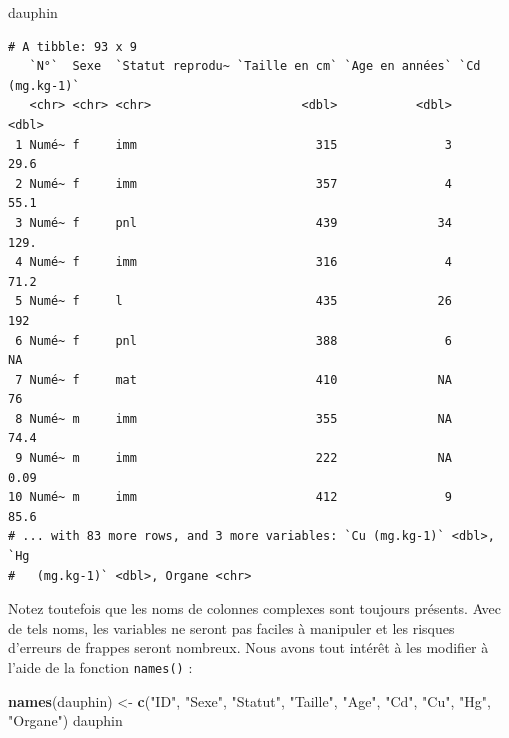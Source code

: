 \documentclass[a4paperpaper,]{article}
\newenvironment{Shaded}{\begin{snugshade}}{\end{snugshade}}
\newcommand{\KeywordTok}[1]{\textcolor[rgb]{0.12,0.11,0.11}{\textbf{#1}}}
\newcommand{\NormalTok}[1]{\textcolor[rgb]{0.12,0.11,0.11}{#1}}
\newcommand{\StringTok}[1]{\textcolor[rgb]{0.75,0.01,0.01}{#1}}
\theoremstyle{definition}
\theoremstyle{definition}
\theoremstyle{definition}
\theoremstyle{remark}
\begin{document}
\begin{Shaded}
\begin{Highlighting}[]
\NormalTok{dauphin}
\end{Highlighting}
\end{Shaded}

\begin{verbatim}
# A tibble: 93 x 9
   `N°`  Sexe  `Statut reprodu~ `Taille en cm` `Age en années` `Cd (mg.kg-1)`
   <chr> <chr> <chr>                     <dbl>           <dbl>          <dbl>
 1 Numé~ f     imm                         315               3          29.6 
 2 Numé~ f     imm                         357               4          55.1 
 3 Numé~ f     pnl                         439              34         129.  
 4 Numé~ f     imm                         316               4          71.2 
 5 Numé~ f     l                           435              26         192   
 6 Numé~ f     pnl                         388               6          NA   
 7 Numé~ f     mat                         410              NA          76   
 8 Numé~ m     imm                         355              NA          74.4 
 9 Numé~ m     imm                         222              NA           0.09
10 Numé~ m     imm                         412               9          85.6 
# ... with 83 more rows, and 3 more variables: `Cu (mg.kg-1)` <dbl>, `Hg
#   (mg.kg-1)` <dbl>, Organe <chr>
\end{verbatim}

Notez toutefois que les noms de colonnes complexes sont toujours
présents. Avec de tels noms, les variables ne seront pas faciles à
manipuler et les risques d'erreurs de frappes seront nombreux. Nous
avons tout intérêt à les modifier à l'aide de la fonction
\texttt{names()} :

\begin{Shaded}
\begin{Highlighting}[]
\KeywordTok{names}\NormalTok{(dauphin) <-}\StringTok{ }\KeywordTok{c}\NormalTok{(}\StringTok{"ID"}\NormalTok{, }\StringTok{"Sexe"}\NormalTok{, }\StringTok{"Statut"}\NormalTok{, }\StringTok{"Taille"}\NormalTok{, }\StringTok{"Age"}\NormalTok{, }\StringTok{"Cd"}\NormalTok{, }\StringTok{"Cu"}\NormalTok{, }\StringTok{"Hg"}\NormalTok{, }\StringTok{"Organe"}\NormalTok{)}
\NormalTok{dauphin}
\end{Highlighting}
\end{Shaded}
\end{document}
